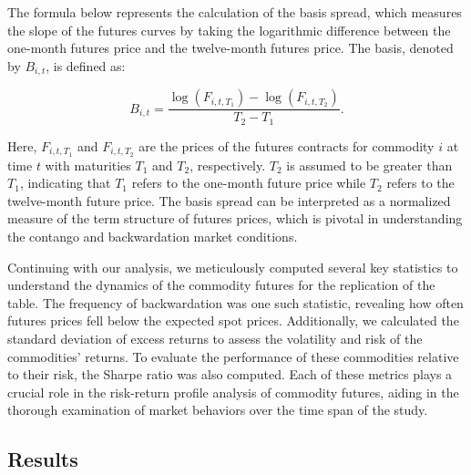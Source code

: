 \documentclass{article}
\begin{document}
The formula below represents the calculation of the basis spread, which measures the slope of the futures curves by taking the logarithmic difference between the one-month futures price and the twelve-month futures price. The basis, denoted by \( B_{i,t} \), is defined as:

\[
B_{i,t} = \frac{\log(F_{i,t,T_1}) - \log(F_{i,t,T_2})}{T_2 - T_1}.
\]

Here, \( F_{i,t,T_1} \) and \( F_{i,t,T_2} \) are the prices of the futures contracts for commodity \( i \) at time \( t \) with maturities \( T_1 \) and \( T_2 \), respectively. \( T_2 \) is assumed to be greater than \( T_1 \), indicating that \( T_1 \) refers to the one-month future price while \( T_2 \) refers to the twelve-month future price. The basis spread can be interpreted as a normalized measure of the term structure of futures prices, which is pivotal in understanding the contango and backwardation market conditions.

Continuing with our analysis, we meticulously computed several key statistics to understand the dynamics of the commodity futures for the replication of the table. The frequency of backwardation was one such statistic, revealing how often futures prices fell below the expected spot prices. Additionally, we calculated the standard deviation of excess returns to assess the volatility and risk of the commodities' returns. To evaluate the performance of these commodities relative to their risk, the Sharpe ratio was also computed. Each of these metrics plays a crucial role in the risk-return profile analysis of commodity futures, aiding in the thorough examination of market behaviors over the time span of the study.

\subsection{Results}
\end{document}
